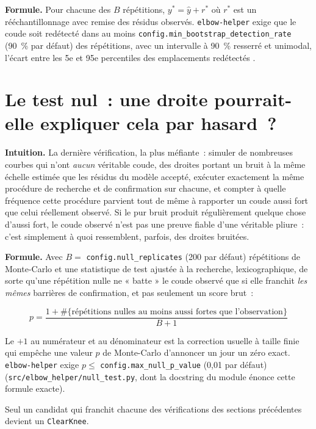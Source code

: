 \documentclass[11pt]{article}
\newcommand{\code}[1]{\texttt{#1}}
\begin{document}
\textbf{Formule.} Pour chacune des $B$ répétitions, $y^\ast = \hat y +
r^\ast$ où $r^\ast$ est un rééchantillonnage avec remise des résidus
observés. \code{elbow-helper} exige que le coude soit redétecté dans au
moins \code{config.min\_bootstrap\_detection\_rate} (90~\% par défaut) des
répétitions, avec un intervalle à 90~\% resserré et unimodal, l'écart entre
les 5e et 95e percentiles des emplacements redétectés \citep{efron1979}
\citep{hastie2009esl}.

\section{Le test nul~: une droite pourrait-elle expliquer cela par hasard~?}
\label{sec:null-test}
\label{sec:test-nul}

\textbf{Intuition.} La dernière vérification, la plus méfiante~: simuler
de nombreuses courbes qui n'ont \emph{aucun} véritable coude, des droites
portant un bruit à la même échelle estimée que les résidus du modèle
accepté, exécuter exactement la même procédure de recherche et de
confirmation sur chacune, et compter à quelle fréquence cette procédure
parvient tout de même à rapporter un coude aussi fort que celui réellement
observé. Si le pur bruit produit régulièrement quelque chose d'aussi fort,
le coude observé n'est pas une preuve fiable d'une véritable pliure~: c'est
simplement à quoi ressemblent, parfois, des droites bruitées.

\textbf{Formule.} Avec $B = $ \code{config.null\_replicates} (200 par
défaut) répétitions de Monte-Carlo et une statistique de test ajustée à la
recherche, lexicographique, de sorte qu'une répétition nulle ne « batte »
le coude observé que si elle franchit \emph{les mêmes} barrières de
confirmation, et pas seulement un score brut~:

\begin{equation}
p = \frac{1 + \#\{\text{répétitions nulles au moins aussi fortes que l'observation}\}}{B + 1}
\end{equation}

Le $+1$ au numérateur et au dénominateur est la correction usuelle à taille
finie qui empêche une valeur $p$ de Monte-Carlo d'annoncer un jour un zéro
exact. \code{elbow-helper} exige $p \le$ \code{config.max\_null\_p\_value}
(0,01 par défaut) (\code{src/elbow\_helper/null\_test.py}, dont la
docstring du module énonce cette formule exacte).

Seul un candidat qui franchit chacune des vérifications des sections
précédentes devient un \code{ClearKnee}.
\end{document}
